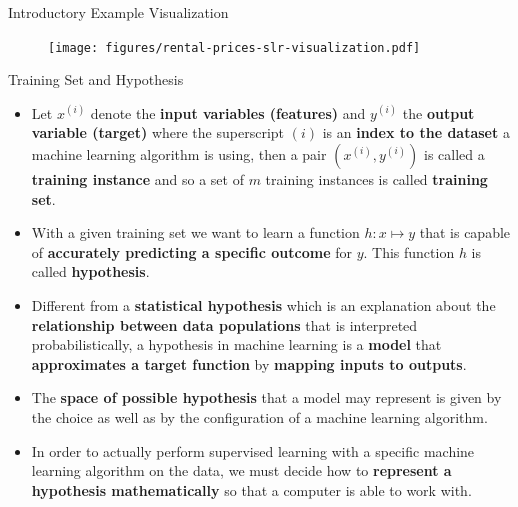 \documentclass[document.tex]{subfiles}
\begin{document}
    \begin{frame}{Introductory Example Visualization}
        \begin{figure}
            \label{fig:rental-prices-slr-visualization}
            \texttt{[image: figures/rental-prices-slr-visualization.pdf]}
        \end{figure}
    \end{frame}

    \begin{frame}{Training Set and Hypothesis}
        \begin{itemize}
            \item Let $x^{(i)}$ denote the \textbf{input variables (features)} and $y^{(i)}$ the \textbf{output variable (target)} where the superscript $(i)$ is an \textbf{index to the dataset} a machine learning algorithm is using, then a pair $(x^{(i)}, y^{(i)})$ is called a \textbf{training instance} and so a set of $m$ training instances is called \textbf{training set}.
            \item With a given training set we want to learn a function $h:x \mapsto y$ that is capable of \textbf{accurately predicting a specific outcome} for $y$. This function $h$ is called \textbf{hypothesis}.
            \item Different from a \textbf{statistical hypothesis} which is an explanation about the \textbf{relationship between data populations} that is interpreted probabilistically, a hypothesis in machine learning is a \textbf{model} that \textbf{approximates a target function} by \textbf{mapping inputs to outputs}. 
            \item The \textbf{space of possible hypothesis} that a model may represent is given by the choice as well as by the configuration of a machine learning algorithm.
            \item In order to actually perform supervised learning with a specific machine learning algorithm on the data, we must decide how to \textbf{represent a hypothesis mathematically}  so that a computer is able to work with.
        \end{itemize}
    \end{frame}
\end{document}
